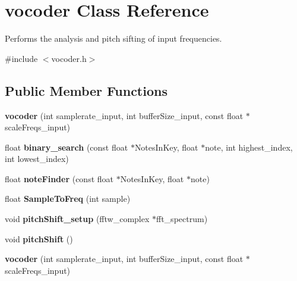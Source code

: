 \hypertarget{classvocoder}{\section{vocoder Class Reference}
\label{classvocoder}
}


Performs the analysis and pitch sifting of input frequencies.  




{\ttfamily \#include $<$vocoder.\-h$>$}

\subsection*{Public Member Functions}
\begin{DoxyCompactItemize}
\item 
\hypertarget{classvocoder_a5e51f2bff73fdb41cb326e0743170b15}{{\bfseries vocoder} (int samplerate\-\_\-input, int buffer\-Size\-\_\-input, const float $\ast$scale\-Freqs\-\_\-input)}\label{classvocoder_a5e51f2bff73fdb41cb326e0743170b15}

\item 
\hypertarget{classvocoder_a7a0b1f788e03878de287d7f6163208a9}{float {\bfseries binary\-\_\-search} (const float $\ast$Notes\-In\-Key, float $\ast$note, int highest\-\_\-index, int lowest\-\_\-index)}\label{classvocoder_a7a0b1f788e03878de287d7f6163208a9}

\item 
\hypertarget{classvocoder_afb731a113935c575939ebdff7ae37580}{float {\bfseries note\-Finder} (const float $\ast$Notes\-In\-Key, float $\ast$note)}\label{classvocoder_afb731a113935c575939ebdff7ae37580}

\item 
\hypertarget{classvocoder_a2b3a6e386d3a18f9366320e5743d33b1}{float {\bfseries Sample\-To\-Freq} (int sample)}\label{classvocoder_a2b3a6e386d3a18f9366320e5743d33b1}

\item 
\hypertarget{classvocoder_aa3d122aee6d6ae77ac5b04572e924dc0}{void {\bfseries pitch\-Shift\-\_\-setup} (fftw\-\_\-complex $\ast$fft\-\_\-spectrum)}\label{classvocoder_aa3d122aee6d6ae77ac5b04572e924dc0}

\item 
\hypertarget{classvocoder_aa218678a51da7429066c32e59edd5057}{void {\bfseries pitch\-Shift} ()}\label{classvocoder_aa218678a51da7429066c32e59edd5057}

\item 
\hypertarget{classvocoder_a5e51f2bff73fdb41cb326e0743170b15}{{\bfseries vocoder} (int samplerate\-\_\-input, int buffer\-Size\-\_\-input, const float $\ast$scale\-Freqs\-\_\-input)}\label{classvocoder_a5e51f2bff73fdb41cb326e0743170b15}


\end{DoxyCompactItemize}
